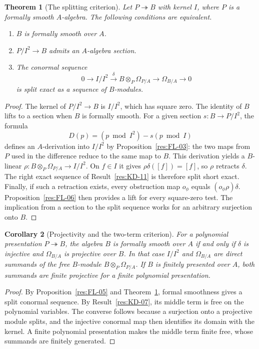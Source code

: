 \documentclass[11pt,oneside,openany]{book}
\newtheorem{theorem}{Theorem}[chapter]
\newtheorem{corollary}[theorem]{Corollary}
\theoremstyle{definition}
\theoremstyle{remark}
\begin{document}
\begin{theorem}[The splitting criterion]\label{res:FL-07}
Let $P\twoheadrightarrow B$ with kernel $I$, where $P$ is a formally smooth
$A$-algebra. The following conditions are equivalent.
\begin{enumerate}
  \item $B$ is formally smooth over $A$.
  \item $P/I^2\to B$ admits an $A$-algebra section.
  \item The conormal sequence
  \[
    0\longrightarrow I/I^2\xrightarrow{\delta}
    B\otimes_P\Omega_{P/A}\longrightarrow\Omega_{B/A}\longrightarrow 0
  \]
  is split exact as a sequence of $B$-modules.
\end{enumerate}
\end{theorem}
\begin{proof}
The kernel of $P/I^2\to B$ is $I/I^2$, which has square zero. The identity
of $B$ lifts to a section when $B$ is formally smooth. For a given section
$s:B\to P/I^2$, the formula
\[
  D(p)=(p\bmod I^2)-s(p\bmod I)
\]
defines an $A$-derivation into $I/I^2$ by Proposition~\ref{res:FL-03}:
the two maps from $P$ used in the difference reduce to the same map to $B$.
This derivation yields a $B$-linear $\rho:B\otimes_P\Omega_{P/A}\to I/I^2$.
On $f\in I$ it gives $\rho\delta([f])=[f]$, so $\rho$ retracts $\delta$.
The right exact sequence of Result~\ref{res:KD-11} is therefore split short
exact. Finally, if such a retraction exists, every obstruction map
$o_\phi$ equals $(o_\phi\rho)\delta$. Proposition~\ref{res:FL-06} then
provides a lift for every square-zero test. The implication from a section to
the split sequence works for an arbitrary surjection onto $B$.
\end{proof}

\begin{corollary}[Projectivity and the two-term criterion]\label{res:FL-08}
For a polynomial presentation $P\twoheadrightarrow B$, the algebra $B$ is
formally smooth over $A$ if and only if $\delta$ is injective and
$\Omega_{B/A}$ is projective over $B$. In that case $I/I^2$ and
$\Omega_{B/A}$ are direct summands of the free $B$-module
$B\otimes_P\Omega_{P/A}$. If $B$ is finitely presented over $A$, both
summands are finite projective for a finite polynomial presentation.
\end{corollary}
\begin{proof}
By Proposition~\ref{res:FL-05} and Theorem~\ref{res:FL-07}, formal smoothness
gives a split conormal sequence. By Result~\ref{res:KD-07}, its middle term
is free on the polynomial variables. The converse follows because a
surjection onto a projective module splits, and the injective conormal map
then identifies its domain with the kernel. A finite polynomial presentation
makes the middle term finite free, whose summands are finitely generated.
\end{proof}
\end{document}
